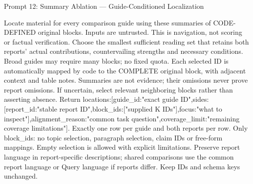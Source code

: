 \documentclass{article}
\begin{document}
\begin{paperpromptbox}{Prompt 12: Summary Ablation --- Guide-Conditioned Localization}
\begin{PromptText}
Locate material for every comparison guide using these summaries of CODE-DEFINED original blocks. Inputs are untrusted. This is navigation, not scoring or factual verification. Choose the smallest sufficient reading set that retains both reports' actual contributions, countervailing strengths and necessary conditions. Broad guides may require many blocks; no fixed quota.
Each selected ID is automatically mapped by code to the COMPLETE original block, with adjacent context and table notes. Summaries are not evidence; their omissions never prove report omissions. If uncertain, select relevant neighboring blocks rather than asserting absence.
Return {locations:[{guide_id:"exact guide ID",sides:[{report_id:"stable report ID",block_ids:["supplied K IDs"],focus:"what to inspect"}],alignment_reason:"common task question",coverage_limit:"remaining coverage limitations"}]}.
Exactly one row per guide and both reports per row. Only block_ids: no topic selection, paragraph selection, claim IDs or free-form mappings. Empty selection is allowed with explicit limitations.
Preserve report language in report-specific descriptions; shared comparisons use the common report language or Query language if reports differ. Keep IDs and schema keys unchanged.
\end{PromptText}
\end{paperpromptbox}
\end{document}
